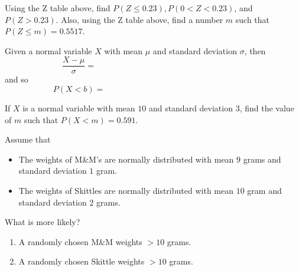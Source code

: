 \documentclass[12pt, a4paper]{article}
\begin{document}
\begin{ex}
  Using the Z table above, find \(P(Z \leq 0.23), P(0 < Z < 0.23)\),
  and \(P(Z > 0.23)\). Also, using the Z table above, find a number
  \(m\) such that \(P(Z \leq m)  = 0.5517\). 
\end{ex}
\begin{thrm}
  Given a normal variable \(X\) with mean \(\mu\) and standard
  deviation \(\sigma\), then \[
    \frac{X-\mu}{\sigma} = \hspace{3in}
  \]
  and so \[
    P(X < b) = \hspace{3in}
  \]
\end{thrm}
\begin{ex}
  If \(X\) is a normal variable with mean \(10\) and standard
  deviation \(3\), find the value of \(m\) such that \(P(X<m) = 0.591\). 
\end{ex}
\vspace{-0.5in}
\begin{ex}
  Assume that
  \begin{itemize}
  \item The weights of M\&M's are normally distributed with mean
    \(9\) grams and standard deviation \(1\) gram.
  \item The weights of Skittles are normally distributed with mean
    \(10\) gram and standard deviation \(2\) grams.
  \end{itemize}
  What is more likely?
  \begin{enumerate}
  \item A randomly chosen M\&M weights \(>10\) grams.
  \item A randomly chosen Skittle weights \(>10\) grams.
  \end{enumerate}

\end{ex}
\end{document}
